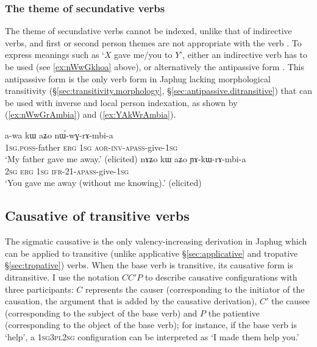 \subsubsection{The theme of secundative verbs} \label{sec:secundative.theme}
The theme of secundative verbs cannot be indexed, unlike that of indirective verbs, and first or second person themes are not appropriate with the verb . To express meanings such as `$X$ gave me/you to $Y$', either an indirective verb has to be used (see \ref{ex:nWwGkhoa} above), or alternatively the antipassive form . This antipassive form is the only verb form in Japhug lacking morphological transitivity (§\ref{sec:transitivity.morphology}, §\ref{sec:antipassive.ditransitive}) that can be used with inverse  and local person indexation, as shown by (\ref{ex:nWwGrAmbia}) and (\ref{ex:YAkWrAmbia}).

\begin{exe}
	\ex 
	\begin{xlist}
		\ex \label{ex:nWwGrAmbia}
		\gll  a-wa kɯ aʑo nɯ́-wɣ-rɤ-mbi-a \\
		\textsc{1sg}.\textsc{poss}-father \textsc{erg} \textsc{1sg} \textsc{aor}-\textsc{inv}-\textsc{apass}-give-\textsc{1sg} \\
		\glt `My father gave me away.' (elicited)
		\ex \label{ex:YAkWrAmbia}
		\gll nɤʑo kɯ aʑo ɲɤ-kɯ-rɤ-mbi-a \\
		\textsc{2sg} \textsc{erg} \textsc{1sg} \textsc{ifr}-2\fl{}1-\textsc{apass}-give-\textsc{1sg} \\
		\glt `You gave me away (without me knowing).' (elicited)
	\end{xlist}
\end{exe}

\subsection{Causative of transitive verbs} \label{sec:ditransitive.causative}
     
The sigmatic causative is the only valency-increasing derivation in Japhug which can be applied to transitive (unlike applicative §\ref{sec:applicative} and tropative §\ref{sec:tropative}) verbs. When the base verb is transitive, its causative form is ditransitive. I use the notation $C$\fl{}$C'$\fl{}$P$ to describe causative configurations with three participants: $C$ represents the causer (corresponding to the initiator of the causation, the argument that is added by the causative derivation), $C'$ the causee (corresponding to the subject of the base verb) and $P$ the patientive (corresponding to the object of the base verb); for instance, if the base verb is `help', a \textsc{1sg}\fl{}\textsc{3pl}\fl{}\textsc{2sg} configuration can be interpreted as `I made them help you.'

